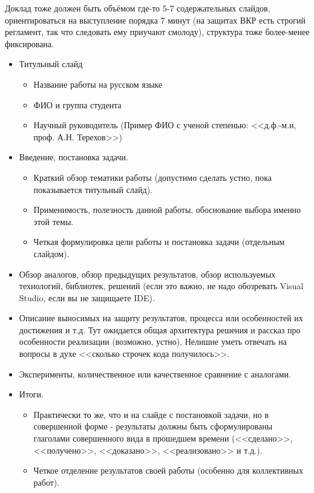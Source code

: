 \documentclass[a5paper]{article}
\begin{document}
Доклад тоже должен быть объёмом где-то 5-7 содержательных слайдов, ориентироваться на выступление порядка 7 минут (на защитах ВКР есть строгий регламент, так что следовать ему приучают смолоду), структура тоже более-менее фиксирована.
\begin{itemize}
	\item Титульный слайд
	\begin{itemize}
		\item Название работы на русском языке
		\item ФИО и группа студента
		\item Научный руководитель (Пример ФИО с ученой степенью: <<д.ф.-м.н, проф. А.Н. Терехов>>)
	\end{itemize}
	\item Введение, постановка задачи.
	\begin{itemize}
		\item Краткий обзор тематики работы (допустимо сделать устно, пока показывается титульный слайд).
		\item Применимость, полезность данной работы, обоснование выбора именно этой темы.
		\item Четкая формулировка цели работы и постановка задачи (отдельным слайдом).
	\end{itemize}
	\item Обзор аналогов, обзор предыдущих результатов, обзор используемых технологий, библиотек, решений (если это важно, не надо обозревать Visual Studio, если вы не защищаете IDE).
	\item Описание выносимых на защиту результатов, процесса или особенностей их достижения и т.д. Тут ожидается общая архитектура решения и рассказ про особенности реализации (возможно, устно). Нелишне уметь отвечать на вопросы в духе <<сколько строчек кода получилось>>.
	\item Эксперименты, количественное или качественное сравнение с аналогами.
	\item Итоги.
	\begin{itemize}
		\item Практически то же, что и на слайде с постановкой задачи, но в совершенной форме - результаты должны быть сформулированы глаголами совершенного вида в прошедшем времени (<<сделано>>, <<получено>>, <<доказано>>, <<реализовано>> и т.д.).
		\item Четкое отделение результатов своей работы (особенно для коллективных работ).
	\end{itemize}
\end{itemize}
\end{document}
